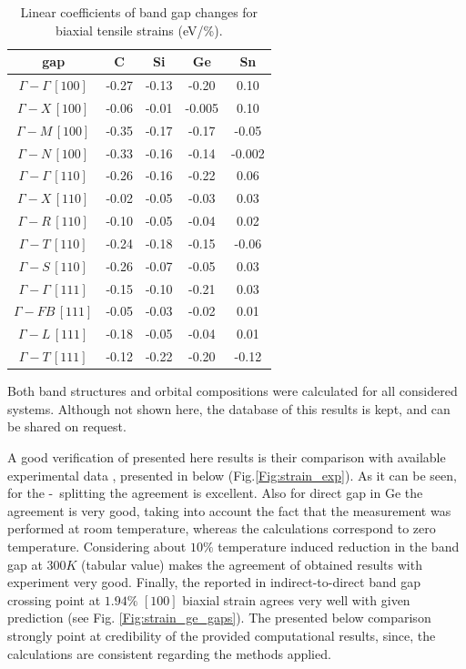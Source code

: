 \begin{table}[!htbp]
    \centering
    \caption{Linear coefficients of band gap changes for biaxial tensile strains (eV/\%).}
    \begin{tabular}{|c|c|c|c|c|}
        \hline
        gap          & C & Si & Ge & Sn \\ \hline
        $\Gamma-\Gamma\,[100]$  & -0.27  & -0.13 & -0.20 & 0.10 \\ \hline
        $\Gamma-X\,[100]$  & -0.06  & -0.01 & -0.005 & 0.10 \\ \hline
        $\Gamma-M\,[100]$  & -0.35  & -0.17 & -0.17 & -0.05 \\ \hline
        $\Gamma-N\,[100]$  & -0.33 & -0.16 & -0.14 & -0.002 \\ \hline
        $\Gamma-\Gamma\,[110]$  & -0.26 & -0.16 & -0.22 & 0.06 \\ \hline
        $\Gamma-X\,[110]$  & -0.02 & -0.05 & -0.03 & 0.03 \\ \hline
        $\Gamma-R\,[110]$  & -0.10 & -0.05 & -0.04 & 0.02 \\ \hline
        $\Gamma-T\,[110]$  & -0.24 & -0.18 & -0.15 & -0.06 \\ \hline
        $\Gamma-S\,[110]$  & -0.26 & -0.07 & -0.05 & 0.03 \\ \hline
        $\Gamma-\Gamma\,[111]$  & -0.15 & -0.10 & -0.21 & 0.03 \\ \hline
        $\Gamma-FB\,[111]$ & -0.05 & -0.03 & -0.02 & 0.01 \\ \hline
        $\Gamma-L\,[111]$  & -0.18 & -0.05 & -0.04 & 0.01 \\ \hline
        $\Gamma-T\,[111]$  & -0.12 & -0.22 & -0.20 & -0.12 \\ \hline
    \end{tabular}
    \label{Tab:strain_gap_bi_tensile}
\end{table}

Both band structures and orbital compositions were calculated for all considered systems.
Although not shown here, the database of this results is kept, and can be shared on request.

A good verification of presented here results is their comparison with available experimental data \cite{Ge-app2010, Ge-exp2011, Ge-exp2016, Ge-app2018}, presented in below (Fig.\ref{Fig:strain_exp}).
As it can be seen, for the \LH-\HH\ splitting the agreement is excellent. Also for direct gap in Ge the agreement is very good, taking into account the fact that the measurement was performed at room temperature, whereas the calculations correspond to zero temperature.
Considering about $10\%$ temperature induced reduction in the band gap  at $300K$ (tabular value) makes the agreement of obtained results with experiment very good.
Finally, the reported in \cite{Ge-exp2018} indirect-to-direct band gap crossing point at $1.94\%$ $[100]$ biaxial strain agrees very well with given prediction (see Fig. \ref{Fig:strain_ge_gaps}).
The presented below comparison strongly point at credibility of the provided computational results, since, the calculations are consistent regarding the methods applied.

